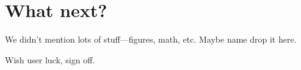 \chapter{What next?}

We didn't mention lots of stuff---figures, math, etc.
Maybe name drop it here.

Wish user luck, sign off.
